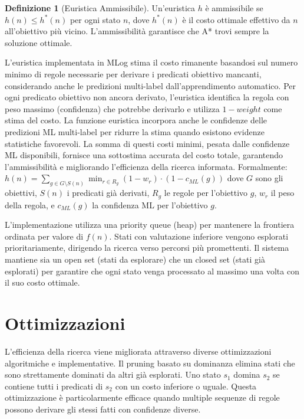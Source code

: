 \documentclass[12pt,a4paper]{report}
\theoremstyle{definition}
\newtheorem{definizione}{Definizione}[chapter]
\begin{document}
\begin{definizione}[Euristica Ammissibile]
Un'euristica $h$ è ammissibile se $h(n) \leq h^*(n)$ per ogni stato $n$, dove $h^*(n)$ è il costo ottimale effettivo da $n$ all'obiettivo più vicino. L'ammissibilità garantisce che A* trovi sempre la soluzione ottimale.
\end{definizione}

L'euristica implementata in MLog stima il costo rimanente basandosi sul numero minimo di regole necessarie per derivare i predicati obiettivo mancanti, considerando anche le predizioni multi-label dall'apprendimento automatico. Per ogni predicato obiettivo non ancora derivato, l'euristica identifica la regola con peso massimo (confidenza) che potrebbe derivarlo e utilizza $1 - weight$ come stima del costo. La funzione euristica incorpora anche le confidenze delle predizioni ML multi-label per ridurre la stima quando esistono evidenze statistiche favorevoli. La somma di questi costi minimi, pesata dalle confidenze ML disponibili, fornisce una sottostima accurata del costo totale, garantendo l'ammissibilità e migliorando l'efficienza della ricerca informata. Formalmente: $h(n) = \sum_{g \in G \setminus S(n)} \min_{r \in R_g} (1 - w_r) \cdot (1 - c_{ML}(g))$ dove $G$ sono gli obiettivi, $S(n)$ i predicati già derivati, $R_g$ le regole per l'obiettivo $g$, $w_r$ il peso della regola, e $c_{ML}(g)$ la confidenza ML per l'obiettivo $g$.

L'implementazione utilizza una priority queue (heap) per mantenere la frontiera ordinata per valore di $f(n)$. Stati con valutazione inferiore vengono esplorati prioritariamente, dirigendo la ricerca verso percorsi più promettenti. Il sistema mantiene sia un open set (stati da esplorare) che un closed set (stati già esplorati) per garantire che ogni stato venga processato al massimo una volta con il suo costo ottimale.

\section{Ottimizzazioni}

L'efficienza della ricerca viene migliorata attraverso diverse ottimizzazioni algoritmiche e implementative. Il pruning basato su dominanza elimina stati che sono strettamente dominati da altri già esplorati. Uno stato $s_1$ domina $s_2$ se contiene tutti i predicati di $s_2$ con un costo inferiore o uguale. Questa ottimizzazione è particolarmente efficace quando multiple sequenze di regole possono derivare gli stessi fatti con confidenze diverse.
\end{document}
